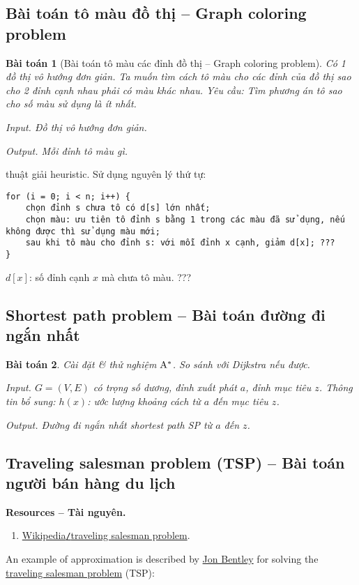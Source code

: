 \documentclass{article}
\newtheorem{baitoan}{Bài toán}
\begin{document}

\subsection{Bài toán tô màu đồ thị -- Graph coloring problem}

\begin{baitoan}[Bài toán tô màu các đỉnh đồ thị -- Graph coloring problem]
	Có 1 đồ thị vô hướng đơn giản. Ta muốn tìm cách tô màu cho các đỉnh của đồ thị sao cho 2 đỉnh cạnh nhau phải có màu khác nhau. Yêu cầu: Tìm phương án tô sao cho số màu sử dụng là ít nhất.
	\item {\sf Input.} Đồ thị vô hướng đơn giản.
	\item {\sf Output.} Mỗi đỉnh tô màu gì.
\end{baitoan}
{ thuật giải heuristic.} Sử dụng nguyên lý thứ tự:
\begin{verbatim}
for (i = 0; i < n; i++) {
    chọn đỉnh s chưa tô có d[s] lớn nhất;
    chọn màu: ưu tiên tô đỉnh s bằng 1 trong các màu đã sử dụng, nếu không được thì sử dụng màu mới;
    sau khi tô màu cho đỉnh s: với mỗi đỉnh x cạnh, giảm d[x]; ???
}
\end{verbatim}
$d[x]$: số đỉnh cạnh $x$ mà chưa tô màu. ???


\subsection{Shortest path problem -- Bài toán đường đi ngắn nhất}

\begin{baitoan}
	Cài đặt \& thử nghiệm $\rm A^*$. So sánh với Dijkstra nếu được.
	\item {\sf Input.} $G = (V,E)$ có trọng số dương, đỉnh xuất phát $a$, đỉnh mục tiêu $z$. Thông tin bổ sung: $h(x)$: ước lượng khoảng cách từ $a$ đến mục tiêu $z$.
	\item {\sf Output.} Đường đi ngắn nhất shortest path SP từ $a$ đến $z$.
\end{baitoan}


\subsection{Traveling salesman problem (TSP) -- Bài toán người bán hàng du lịch}
\textbf{\textbf{Resources -- Tài nguyên.}}
\begin{enumerate}
	\item \href{https://en.wikipedia.org/wiki/Travelling_salesman_problem}{Wikipedia{\tt/}traveling salesman problem}.
\end{enumerate}
An example of approximation is described by \href{https://en.wikipedia.org/wiki/Jon_Bentley_(computer_scientist)}{\sc Jon Bentley} for solving the \href{https://en.wikipedia.org/wiki/Travelling_salesman_problem}{traveling salesman problem} (TSP):
\end{document}
